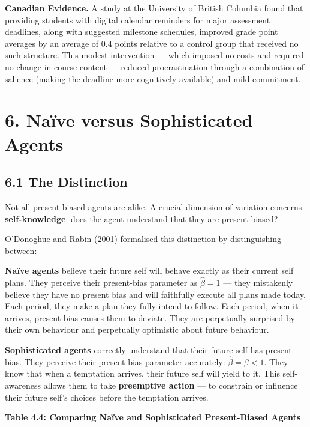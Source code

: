 \documentclass[12pt, letterpaper]{article}
\begin{document}
\textbf{Canadian Evidence.} A study at the University of British Columbia found that providing students with digital calendar reminders for major assessment deadlines, along with suggested milestone schedules, improved grade point averages by an average of 0.4 points relative to a control group that received no such structure. This modest intervention --- which imposed no costs and required no change in course content --- reduced procrastination through a combination of salience (making the deadline more cognitively available) and mild commitment.

\medskip


\section{6. Naïve versus Sophisticated Agents}



\subsection{6.1 The Distinction}


Not all present-biased agents are alike. A crucial dimension of variation concerns \textbf{self-knowledge}: does the agent understand that they are present-biased?

O'Donoghue and Rabin (2001) formalised this distinction by distinguishing between:

\textbf{Naïve agents} believe their future self will behave exactly as their current self plans. They perceive their present-bias parameter as $\hat{\beta} = 1$ --- they mistakenly believe they have no present bias and will faithfully execute all plans made today. Each period, they make a plan they fully intend to follow. Each period, when it arrives, present bias causes them to deviate. They are perpetually surprised by their own behaviour and perpetually optimistic about future behaviour.

\textbf{Sophisticated agents} correctly understand that their future self has present bias. They perceive their present-bias parameter accurately: $\hat{\beta} = \beta < 1$. They know that when a temptation arrives, their future self will yield to it. This self-awareness allows them to take \textbf{preemptive action} --- to constrain or influence their future self's choices before the temptation arrives.

\textbf{Table 4.4: Comparing Naïve and Sophisticated Present-Biased Agents}
\end{document}
